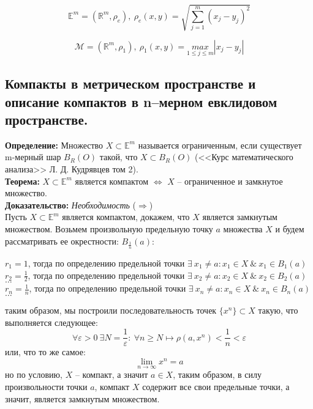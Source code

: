 \documentclass[a4paper,12pt]{article} %
\begin{document}
\begin{equation*}
    \mathbb{E}^m = (\mathbb{R}^m, \rho_e), ~ \rho_e(x, y) = \sqrt{\sum_{j = 1}^m (x_j - y_j)^2}
\end{equation*}
    
\begin{equation*}
    \mathscr{M} = (\mathbb{R}^m, \rho_{1}), ~ \rho_{1}(x, y) = \underset{1 \leqslant j \leqslant m}{max} |x_j - y_j|
\end{equation*}

\subsection*{Компакты в метрическом пространстве и описание компактов в n–мерном евклидовом пространстве.}

\noindent \textbf{Определение:} Множество $X \subset \mathbb{E}^m$ называется ограниченным, если существует m-мерный шар $B_{R}(O)$ такой, что $X \subset B_{R}(O)$ (<<Курс математического анализа>> Л. Д. Кудрявцев том 2).\\

\noindent \textbf{Теорема:} $X \subset \mathbb{E}^m$ является компактом $\Leftrightarrow$ $X$ -- ограниченное и замкнутое множество.\\

\noindent \textbf{Доказательство:} \textit{Необходимость} ($\Rightarrow$)\\
\noindent Пусть $X \subset \mathbb{E}^m$ является компактом, докажем, что $X$ является замкнутым множеством. Возьмем произвольную предельную точку $a$ множества $X$ и будем рассматривать ее окрестности: $B_{\frac{1}{n}}(a)$:
\begin{center}
    $r_1 = 1$, тогда по определению предельной точки $\exists ~ x_1 \neq a : x_1 \in X ~ \& ~ x_1 \in B_{1}(a)$\\
    $r_2 = \frac{1}{2}$, тогда по определению предельной точки $\exists ~ x_2 \neq a : x_2 \in X ~ \& ~ x_2 \in B_{2}(a)$\\
    $\dots$\\
    $r_n = \frac{1}{n}$, тогда по определению предельной точки $\exists ~ x_n \neq a : x_n \in X ~ \& ~ x_n \in B_{n}(a)$\\
    $\dots$\\
\end{center}
\noindent таким образом, мы построили последовательность точек $\{x^n \} \subset X$ такую, что выполняется следующее:
\[ \forall \varepsilon > 0 ~ \exists N = \frac{1}{\varepsilon} : ~ \forall n \geqslant N \mapsto \rho(a, x^n) < \frac{1}{n} < \varepsilon \]
или, что то же самое:
\[\lim_{n \to \infty} x^n = a \]
но по условию, $X$ -- компакт, а значит $a \in X$, таким образом, в силу произвольности точки $a$, компакт $X$ содержит все свои предельные точки, а значит, является замкнутым множеством.\\
\end{document}
